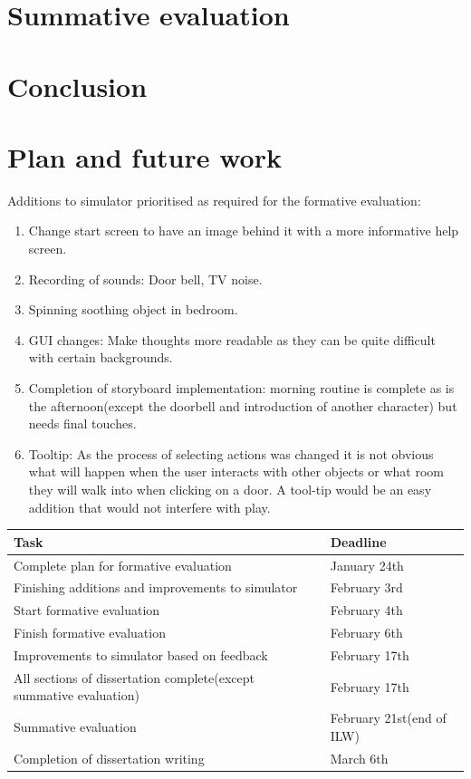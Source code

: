 \documentclass[11pt]{report}
\begin{document}
\chapter{Summative evaluation}

\chapter{Conclusion}

\chapter{Plan and future work}

Additions to simulator prioritised as required for the formative evaluation:

\begin{enumerate}
\item Change start screen to have an image behind it with a more informative help screen.
\item Recording of sounds: Door bell, TV noise.
\item Spinning soothing object in bedroom.
\item GUI changes: Make thoughts more readable as they can be quite difficult with certain backgrounds.
\item Completion of storyboard implementation: morning routine is complete as is the afternoon(except the doorbell and introduction of another character) but needs final touches.
\item Tooltip: As the process of selecting actions was changed it is not obvious what will happen when the user interacts with other objects or what room they will walk into when clicking on a door. A tool-tip would be an easy addition that would not interfere with play.
\end{enumerate}

\begin{table}[H]
\begin{tabular}{| p{8cm} | p{4cm} | }
\hline
Task & Deadline \\
\hline
Complete plan for formative evaluation & January 24th \\
\hline
Finishing additions and improvements to simulator & February 3rd \\
\hline
Start formative evaluation & February 4th \\
\hline
Finish formative evaluation & February 6th \\
\hline
Improvements to simulator based on feedback & February 17th \\
\hline
All sections of dissertation complete(except summative evaluation) & February 17th \\
\hline
Summative evaluation & February 21st(end of ILW) \\
\hline
Completion of dissertation writing & March 6th \\
\hline
\end{tabular}
\end{table}
\end{document}
